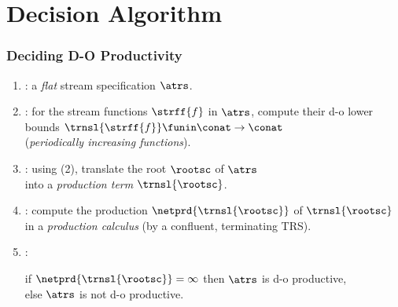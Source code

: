 \documentclass[10pt]{beamer}
\begin{document}
\section{Decision Algorithm}


\begin{frame}%
  \frametitle{Deciding D-O Productivity}


  \begin{enumerate}
      \vspace*{1.65ex}
    \item  {}: a \emph{flat} stream specification $\atrs$.
      \vspace*{1.65ex}
    \item  {}:
      for the stream functions $\strff{f}$ in $\atrs$,
      compute their d-o lower bounds
      $\trnsl{\strff{f}} \funin \conat \to \conat$
      \\ \hspace*{\fill}
      (\emph{periodically increasing functions}).
      \vspace*{1.65ex}
    \item  {}: using (2),
      translate the root $\rootsc$ of $\atrs$\\
      into a \emph{production term} $\trnsl{\rootsc}$.
      \vspace*{1.65ex}
    \item  {}:
      compute the production $\netprd{\trnsl{\rootsc}}$ of $\trnsl{\rootsc}$\\
      in a \emph{production calculus} (by a {confluent, terminating TRS}).
      \vspace*{1.65ex}
    \item {}:
      \parbox[t]{200pt}{%
           if $\netprd{\trnsl{\rootsc}}=\infty$
             then $\atrs$ is \alert{d-o productive},\\
             else $\atrs$ is \alert{not d-o productive}.%
                        }
  \end{enumerate}

\end{frame}%
\end{document}
